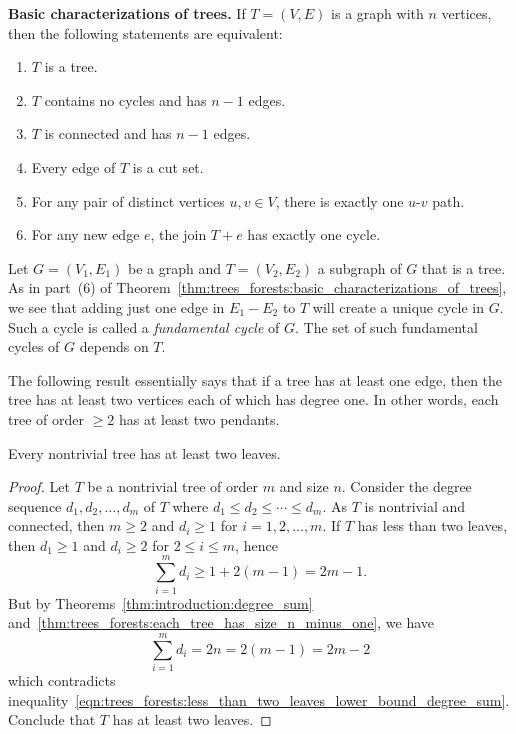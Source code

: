 \begin{theorem}
\label{thm:trees_forests:basic_characterizations_of_trees}
\textbf{Basic characterizations of trees.}
If $T = (V, E)$ is a graph with $n$ vertices, then the following
statements are equivalent:
\begin{enumerate}
\item $T$ is a tree.

\item $T$ contains no cycles and has $n - 1$ edges.

\item $T$ is connected and has $n - 1$ edges.

\item Every edge of $T$ is a cut set.

\item For any pair of distinct vertices $u,v \in V$, there is exactly
  one $u$-$v$ path.

\item For any new edge $e$, the join $T + e$ has exactly one cycle.
\end{enumerate}
\end{theorem}

Let $G = (V_1, E_1)$ be a graph and $T = (V_2, E_2)$ a subgraph of $G$
that is a tree. As in part~(6) of
Theorem~\ref{thm:trees_forests:basic_characterizations_of_trees}, we
see that adding just one edge in $E_1 - E_2$ to $T$ will create a
unique cycle in $G$. Such a cycle is called a
\emph{fundamental cycle} of $G$. The set of
such fundamental cycles of $G$ depends on $T$.

The following result essentially says that if a tree has at least one
edge, then the tree has at least two vertices each of which has degree
one. In other words, each tree of order $\geq 2$ has at least two
pendants.

\begin{theorem}
Every nontrivial tree has at least two leaves.
\end{theorem}

\begin{proof}
Let $T$ be a nontrivial tree of order $m$ and size $n$. Consider the
degree sequence $d_1, d_2, \dots, d_m$ of $T$
where $d_1 \leq d_2 \leq \cdots \leq d_m$. As $T$ is nontrivial and
connected, then $m \geq 2$ and $d_i \geq 1$ for $i = 1, 2, \dots, m$.
If $T$ has less than two leaves, then $d_1 \geq 1$ and $d_i \geq 2$
for $2 \leq i \leq m$, hence
\begin{equation}
\label{eqn:trees_forests:less_than_two_leaves_lower_bound_degree_sum}
\sum_{i=1}^m d_i
\geq
1 + 2(m-1)
=
2m - 1.
\end{equation}
But by Theorems~\ref{thm:introduction:degree_sum}
and~\ref{thm:trees_forests:each_tree_has_size_n_minus_one}, we have
\[
\sum_{i=1}^m d_i
=
2n
=
2(m - 1)
=
2m - 2
\]
which contradicts
inequality~\eqref{eqn:trees_forests:less_than_two_leaves_lower_bound_degree_sum}.
Conclude that $T$ has at least two leaves.
\end{proof}

